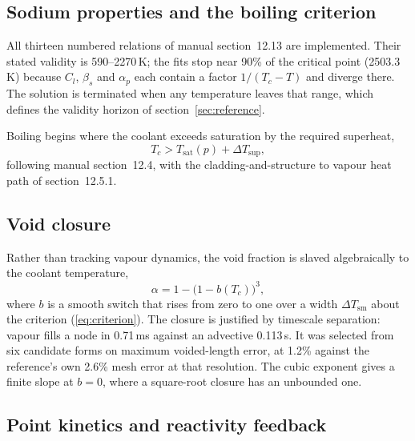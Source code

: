 \documentclass[11pt,a4paper]{article}
\begin{document}
\subsection{Sodium properties and the boiling criterion}

All thirteen numbered relations of manual section~12.13 are implemented. Their stated
validity is 590--2270\,K; the fits stop near 90\% of the critical point (2503.3\,K) because
$C_l$, $\beta_s$ and $\alpha_p$ each contain a factor $1/(T_c - T)$ and diverge there. The
solution is terminated when any temperature leaves that range, which defines the validity
horizon of section~\ref{sec:reference}.

Boiling begins where the coolant exceeds saturation by the required superheat,
\begin{equation}\label{eq:criterion}
T_c > T_{\mathrm{sat}}(p) + \Delta T_{\mathrm{sup}},
\end{equation}
following manual section~12.4, with the cladding-and-structure to vapour heat path of
section~12.5.1.

\subsection{Void closure}\label{sec:closure}

Rather than tracking vapour dynamics, the void fraction is slaved algebraically to the
coolant temperature,
\begin{equation}\label{eq:alpha}
\alpha = 1 - \bigl(1 - b(T_c)\bigr)^{3},
\end{equation}
where $b$ is a smooth switch that rises from zero to one over a width
$\Delta T_{\mathrm{sm}}$ about the criterion (\ref{eq:criterion}). The closure is justified
by timescale separation: vapour fills a node in 0.71\,ms against an advective 0.113\,s. It
was selected from six candidate forms on maximum voided-length error, at 1.2\% against the
reference's own 2.6\% mesh error at that resolution. The cubic exponent gives a finite
slope at $b = 0$, where a square-root closure has an unbounded one.

\subsection{Point kinetics and reactivity feedback}\label{sec:kinetics}
\end{document}
